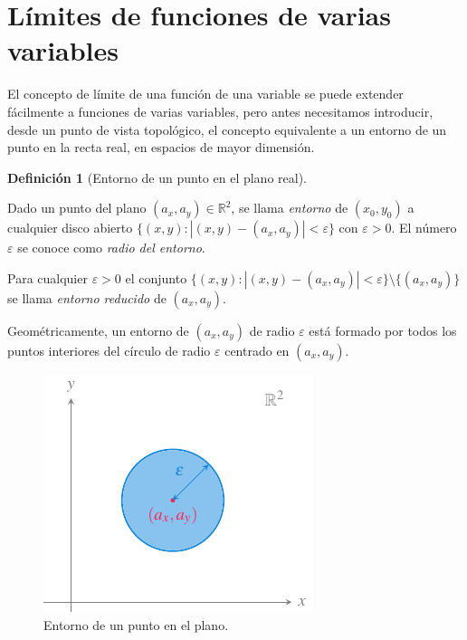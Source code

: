 \documentclass[
  a4paper,
]{scrreport}
\theoremstyle{plain}
\theoremstyle{plain}
\theoremstyle{definition}
\newtheorem{definition}{Definición}[chapter]
\theoremstyle{definition}
\theoremstyle{plain}
\theoremstyle{definition}
\theoremstyle{remark}
\begin{document}
\hypertarget{luxedmites-de-funciones-de-varias-variables}{%
\section{Límites de funciones de varias
variables}\label{luxedmites-de-funciones-de-varias-variables}}

El concepto de límite de una función de una variable se puede extender
fácilmente a funciones de varias variables, pero antes necesitamos
introducir, desde un punto de vista topológico, el concepto equivalente
a un entorno de un punto en la recta real, en espacios de mayor
dimensión.

\begin{definition}[Entorno de un punto en el plano
real]\protect\hypertarget{def-entorno-punto-plano}{}\label{def-entorno-punto-plano}

Dado un punto del plano \((a_x,a_y)\in \mathbb{R}^2\), se llama
\emph{entorno} de \((x_0,y_0)\) a cualquier disco abierto
\(\{(x,y):|(x,y)-(a_x,a_y)|<\varepsilon\}\) con \(\varepsilon>0\). El
número \(\varepsilon\) se conoce como \emph{radio del entorno}.

Para cualquier \(\varepsilon>0\) el conjunto
\(\{(x,y):|(x,y)-(a_x,a_y)|<\varepsilon\}\setminus \{(a_x,a_y)\}\) se
llama \emph{entorno reducido} de \((a_x,a_y)\).

\end{definition}

Geométricamente, un entorno de \((a_x,a_y)\) de radio \(\varepsilon\)
está formado por todos los puntos interiores del círculo de radio
\(\varepsilon\) centrado en \((a_x,a_y)\).

\begin{figure}

{\centering \includegraphics{img/derivadas-funciones-varias-variables/entorno-punto-plano.pdf}

}

\caption{Entorno de un punto en el plano.}

\end{figure}
\end{document}
